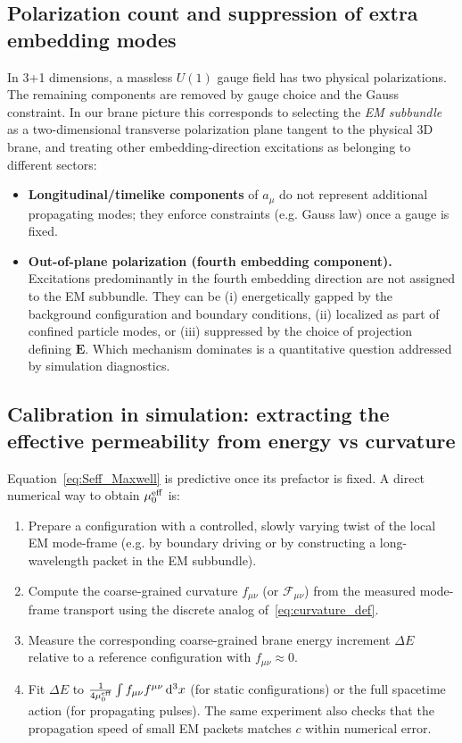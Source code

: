 \documentclass[11pt,a4paper]{article}
\providecommand{\dd}{\mathrm{d}}
\newcommand{\bbF}{\mathcal{F}}              %
\begin{document}
\subsection{Polarization count and suppression of extra embedding modes}
In 3+1 dimensions, a massless \(U(1)\) gauge field has two physical polarizations.
The remaining components are removed by gauge choice and the Gauss constraint.
In our brane picture this corresponds to selecting the \emph{EM subbundle} as a two-dimensional transverse polarization plane
tangent to the physical 3D brane, and treating other embedding-direction excitations as belonging to different sectors:
\begin{itemize}
  \item \textbf{Longitudinal/timelike components} of \(a_\mu\) do not represent additional propagating modes; they enforce constraints
        (e.g. Gauss law) once a gauge is fixed.
  \item \textbf{Out-of-plane polarization (fourth embedding component).} Excitations predominantly in the fourth embedding direction
        are not assigned to the EM subbundle. They can be (i) energetically gapped by the background configuration and boundary conditions,
        (ii) localized as part of confined particle modes, or (iii) suppressed by the choice of projection defining \(\mathbf{E}\).
        Which mechanism dominates is a quantitative question addressed by simulation diagnostics.
\end{itemize}

\subsection{Calibration in simulation: extracting the effective permeability from energy vs curvature}
\label{sec:maxwell_calibration}
Equation~\eqref{eq:Seff_Maxwell} is predictive once its prefactor is fixed.
A direct numerical way to obtain \(\mu_0^{\rm eff}\) is:
\begin{enumerate}
  \item Prepare a configuration with a controlled, slowly varying twist of the local EM mode-frame (e.g. by boundary driving or by constructing
        a long-wavelength packet in the EM subbundle).
  \item Compute the coarse-grained curvature \(f_{\mu\nu}\) (or \(\bbF_{\mu\nu}\)) from the measured mode-frame transport
        using the discrete analog of~\eqref{eq:curvature_def}.
  \item Measure the corresponding coarse-grained brane energy increment \(\Delta E\) relative to a reference configuration with \(f_{\mu\nu}\approx 0\).
  \item Fit \(\Delta E\) to \(\frac{1}{4\mu_0^{\rm eff}}\int f_{\mu\nu}f^{\mu\nu}\,\dd^3x\) (for static configurations) or the full spacetime action
        (for propagating pulses). The same experiment also checks that the propagation speed of small EM packets matches \(c\) within numerical error.
\end{enumerate}
\end{document}
